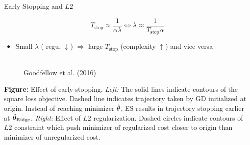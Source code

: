 \documentclass[11pt,compress,t,notes=noshow, xcolor=table]{beamer}
\begin{document}
\begin{vbframe}{Early Stopping and $L2$ }
\begin{itemize}
 \end{itemize}
\begin{equation*}
T_{\text{stop}} \approx \frac{1}{\alpha \lambda} 
\Leftrightarrow \lambda \approx \frac{1}{T_{\text{stop}} \alpha}
\end{equation*}
  \begin{itemize}
    \item Small $\lambda$ ( regu. $\downarrow$) $\Rightarrow$ large $T_{\text{stop}}$ (complexity $\uparrow$) and vice versa
  \end{itemize}
\framebreak
  \begin{figure}
    \centering
      \tiny{\\Goodfellow et al. (2016)\\}
  \end{figure}
  
\footnotesize 
\textbf{Figure:} Effect of early stopping. \textit{Left:} The solid lines indicate contours of the square loss objective. Dashed line indicates trajectory taken by GD initialized at origin. Instead of reaching minimizer $\hat{\theta}$, ES results in trajectory stopping earlier at $\hat{\bm{\theta}}_{\text{Ridge}}$. \textit{Right:} Effect of $L2$ regularization. Dashed circles indicate contours of $L2$ constraint which push minimizer of regularized cost closer to origin than minimizer of unregularized cost.
\end{vbframe}
\end{document}
